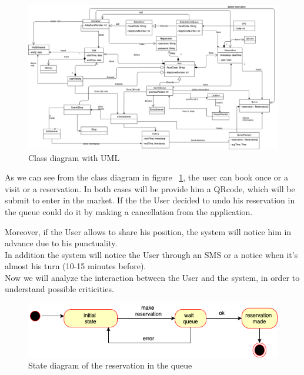 \begin{figure}[h]
  \caption{Class diagram with UML}
  \label{fig:UML}
  \centering
  \includegraphics[width=1.2\textwidth, height=0.7\textwidth]{diagrams/UML_simple.png}

\end{figure}
\par 
\medskip
As we can see from the class diagram in figure ~\ref{fig:UML}, the user can book once or a visit or a reservation.
In both cases will be provide him a QRcode, which will be submit to enter in the market. 
If the the User decided to undo his reservation in the queue could do it by making a cancellation from the application. 
\par
\medskip
Moreover, if the User allows to share his position, the system will notice him in advance due to his punctuality.
\\
In addition the system will notice the User through an SMS or a notice when it's almost his turn (10-15 minutes before).
\\
Now we will analyze the interaction between the User and the system, in order to understand possible criticities.
\par 
\bigskip

\begin{figure}[h]
  \caption{State diagram of the reservation in the queue}
  \label{fig:Reservation}
  \centering
  \includegraphics[width=1.1\textwidth, height=0.3\textwidth]{diagrams/2-reservation.png}

\end{figure}
\par 
\medskip

